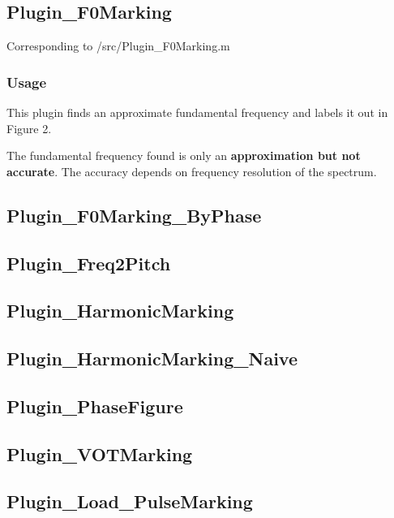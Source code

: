 \subsection{Plugin\_F0Marking}\indent

        Corresponding to /src/Plugin\_F0Marking.m

\subsubsection{Usage}\indent

        This plugin finds an approximate fundamental frequency and labels it out in Figure 2.
        
        The fundamental frequency found is only an \textbf{approximation but not accurate}. The accuracy depends on frequency resolution of the spectrum.
        
        
        \newpage

\subsection{Plugin\_F0Marking\_ByPhase}

\subsection{Plugin\_Freq2Pitch}

\subsection{Plugin\_HarmonicMarking}

\subsection{Plugin\_HarmonicMarking\_Naive}

\subsection{Plugin\_PhaseFigure}

\subsection{Plugin\_VOTMarking}

\subsection{Plugin\_Load\_PulseMarking}

